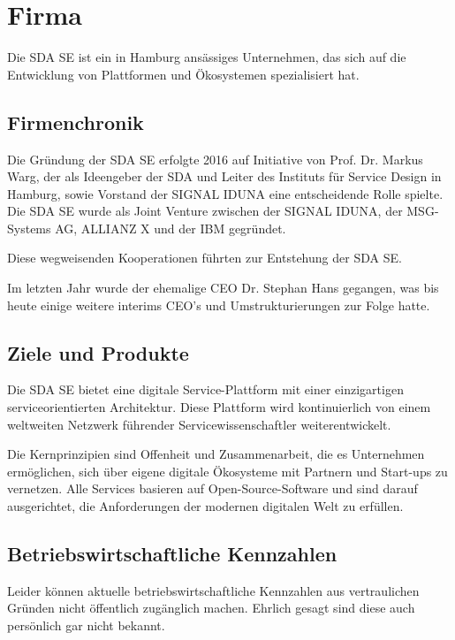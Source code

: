 \chapter{Firma}
\label{ch:firma}
Die SDA SE ist ein in Hamburg ansässiges Unternehmen, das sich auf die Entwicklung von Plattformen und Ökosystemen spezialisiert hat.

\section{Firmenchronik}
\label{sec:intro:firmenchronik}
Die Gründung der SDA SE erfolgte 2016 auf Initiative von Prof. Dr. Markus Warg, der als Ideengeber der SDA und Leiter des Instituts
für Service Design in Hamburg, sowie Vorstand der SIGNAL IDUNA eine entscheidende Rolle spielte.
Die SDA SE wurde als Joint Venture zwischen der SIGNAL IDUNA, der MSG-Systems AG, ALLIANZ X und der IBM gegründet.
\medskip

\noindent
Diese wegweisenden Kooperationen führten zur Entstehung der SDA SE.
\medskip

\noindent
Im letzten Jahr wurde der ehemalige CEO Dr. Stephan Hans gegangen, was bis heute einige weitere interims CEO's und Umstrukturierungen zur Folge hatte.

\section{Ziele und Produkte}
\label{sec:intro:produktspekturm}
Die SDA SE bietet eine digitale Service-Plattform mit einer einzigartigen serviceorientierten Architektur.
Diese Plattform wird kontinuierlich von einem weltweiten Netzwerk führender Servicewissenschaftler weiterentwickelt.
\medskip

\noindent
Die Kernprinzipien sind Offenheit und Zusammenarbeit, die es Unternehmen ermöglichen, sich über eigene digitale Ökosysteme mit Partnern und Start-ups zu vernetzen.
Alle Services basieren auf Open-Source-Software und sind darauf ausgerichtet, die Anforderungen der modernen digitalen Welt zu erfüllen.

\section{Betriebswirtschaftliche Kennzahlen}
\label{sec:intro:betrwirtschaftliche-kennzahlen}
Leider können aktuelle betriebswirtschaftliche Kennzahlen aus vertraulichen Gründen nicht öffentlich zugänglich machen.
Ehrlich gesagt sind diese auch persönlich gar nicht bekannt.

